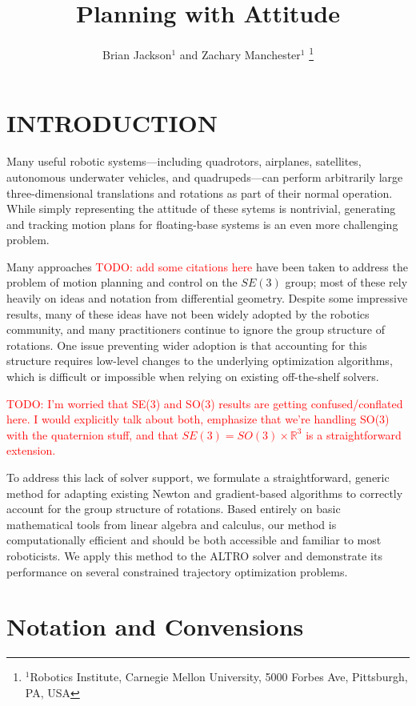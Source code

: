 \documentclass[letterpaper, 10 pt, conference]{ieeeconf}  %
\title{\LARGE \bf
Planning with Attitude
}
\author{Brian Jackson$^1$ and Zachary Manchester$^1$%
    \thanks{
        $^1$Robotics Institute, 
        Carnegie Mellon University, 
        5000 Forbes Ave, Pittsburgh, PA, USA
    }
}
\newcommand{\todo}[1]{\textcolor{red}{TODO: #1}}
\begin{document}
\maketitle

\section{INTRODUCTION} 

    Many useful robotic systems---including quadrotors, airplanes, satellites, autonomous
    underwater vehicles, and quadrupeds---can perform arbitrarily large three-dimensional
    translations and rotations as part of their normal operation. While simply
    representing the attitude of these sytems is nontrivial, generating and tracking
    motion plans for floating-base systems is an even more challenging problem.

    Many approaches \todo{add some citations here} have been taken to address the problem of motion planning and control
    on the $SE(3)$ group; most of these rely heavily on ideas and notation
    from differential geometry. Despite some impressive results, many of these ideas
    have not been widely adopted by the robotics community, and many practitioners continue to ignore the group structure of rotations. One issue preventing wider adoption is that accounting for this structure requires low-level changes to the underlying
    optimization algorithms, which is difficult or impossible when relying on existing
    off-the-shelf solvers.
    
    \todo{I'm worried that SE(3) and SO(3) results are getting confused/conflated here. I would explicitly talk about both, emphasize that we're handling SO(3) with the quaternion stuff, and that $SE(3) = SO(3) \times \mathbb{R}^3$ is a straightforward extension.}

    To address this lack of solver support, we formulate a straightforward, generic method for adapting
    existing Newton and gradient-based algorithms to correctly account for the group structure of
    rotations. Based entirely on basic mathematical tools from linear algebra and
    calculus, our method is computationally efficient and should be both accessible and
    familiar to most roboticists. We apply this method to the ALTRO solver
    \cite{howell2019altro} and demonstrate its performance on several constrained trajectory
    optimization problems.

\section{Notation and Convensions}
\end{document}
